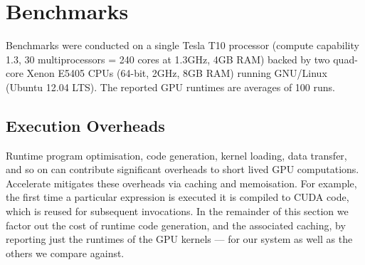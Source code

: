 \section{Benchmarks} %
\label{sec:benchmarks}
Benchmarks were conducted on a single Tesla T10 processor (compute capability 1.3, 30 multiprocessors = 240 cores at 1.3GHz, 4GB RAM) backed by two quad-core Xenon E5405 CPUs (64-bit, 2GHz, 8GB RAM) running GNU/Linux (Ubuntu 12.04 LTS). The reported GPU runtimes are averages of 100 runs.


\subsection{Execution Overheads}
Runtime program optimisation, code generation, kernel loading, data transfer, and so on can contribute significant overheads to short lived GPU computations. Accelerate mitigates these overheads via caching and memoisation. For example, the first time a particular expression is executed it is compiled to CUDA code, which is reused for subsequent invocations. In the remainder of this section we factor out the cost of runtime code generation, and the associated caching, by reporting just the runtimes of the GPU kernels --- for our system as well as the others we compare against. 



